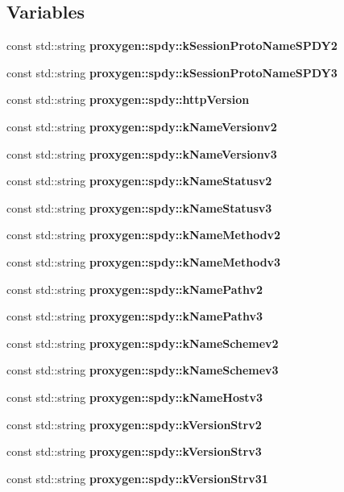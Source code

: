 \subsection*{Variables}
\begin{DoxyCompactItemize}
\item 
const std\+::string {\bf proxygen\+::spdy\+::k\+Session\+Proto\+Name\+S\+P\+D\+Y2}
\item 
const std\+::string {\bf proxygen\+::spdy\+::k\+Session\+Proto\+Name\+S\+P\+D\+Y3}
\item 
const std\+::string {\bf proxygen\+::spdy\+::http\+Version}
\item 
const std\+::string {\bf proxygen\+::spdy\+::k\+Name\+Versionv2}
\item 
const std\+::string {\bf proxygen\+::spdy\+::k\+Name\+Versionv3}
\item 
const std\+::string {\bf proxygen\+::spdy\+::k\+Name\+Statusv2}
\item 
const std\+::string {\bf proxygen\+::spdy\+::k\+Name\+Statusv3}
\item 
const std\+::string {\bf proxygen\+::spdy\+::k\+Name\+Methodv2}
\item 
const std\+::string {\bf proxygen\+::spdy\+::k\+Name\+Methodv3}
\item 
const std\+::string {\bf proxygen\+::spdy\+::k\+Name\+Pathv2}
\item 
const std\+::string {\bf proxygen\+::spdy\+::k\+Name\+Pathv3}
\item 
const std\+::string {\bf proxygen\+::spdy\+::k\+Name\+Schemev2}
\item 
const std\+::string {\bf proxygen\+::spdy\+::k\+Name\+Schemev3}
\item 
const std\+::string {\bf proxygen\+::spdy\+::k\+Name\+Hostv3}
\item 
const std\+::string {\bf proxygen\+::spdy\+::k\+Version\+Strv2}
\item 
const std\+::string {\bf proxygen\+::spdy\+::k\+Version\+Strv3}
\item 
const std\+::string {\bf proxygen\+::spdy\+::k\+Version\+Strv31}
\end{DoxyCompactItemize}
